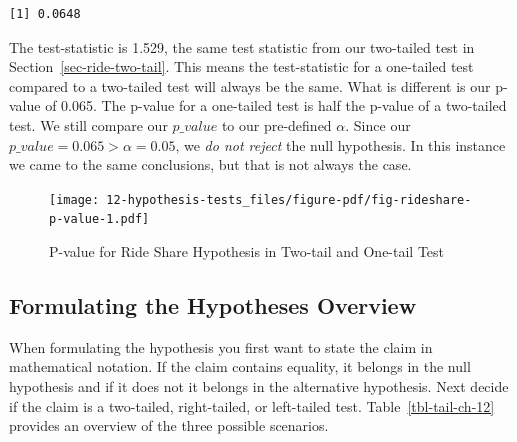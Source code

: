 \documentclass[
  letterpaper,
  DIV=11,
  numbers=noendperiod]{scrreprt}
\newenvironment{Shaded}{\begin{snugshade}}{\end{snugshade}}
\newcommand{\NormalTok}[1]{\textcolor[rgb]{0.00,0.23,0.31}{#1}}
\newcommand{\SpecialCharTok}[1]{\textcolor[rgb]{0.37,0.37,0.37}{#1}}
\theoremstyle{definition}
\theoremstyle{remark}
\begin{document}
\begin{Shaded}
\end{Shaded}

\begin{verbatim}
[1] 0.0648
\end{verbatim}

The test-statistic is 1.529, the same test statistic from our two-tailed
test in Section~\ref{sec-ride-two-tail}. This means the test-statistic
for a one-tailed test compared to a two-tailed test will always be the
same. What is different is our p-value of 0.065. The p-value for a
one-tailed test is half the p-value of a two-tailed test. We still
compare our \(p\_value\) to our pre-defined \(\alpha\). Since our
\(p\_value = 0.065 > \alpha = 0.05\), we \emph{do not reject} the null
hypothesis. In this instance we came to the same conclusions, but that
is not always the case.

\begin{figure}

{\centering \texttt{[image: 12-hypothesis-tests\_files/figure-pdf/fig-rideshare-p-value-1.pdf]}

}

\caption{\label{fig-rideshare-p-value}P-value for Ride Share Hypothesis
in Two-tail and One-tail Test}

\end{figure}

\hypertarget{formulating-the-hypotheses-overview}{%
\subsection{Formulating the Hypotheses
Overview}\label{formulating-the-hypotheses-overview}}

When formulating the hypothesis you first want to state the claim in
mathematical notation. If the claim contains equality, it belongs in the
null hypothesis and if it does not it belongs in the alternative
hypothesis. Next decide if the claim is a two-tailed, right-tailed, or
left-tailed test. Table~\ref{tbl-tail-ch-12} provides an overview of the
three possible scenarios.
\end{document}

